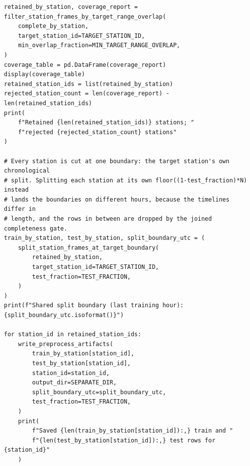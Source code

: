 \begin{verbatim}
retained_by_station, coverage_report = filter_station_frames_by_target_range_overlap(
    complete_by_station,
    target_station_id=TARGET_STATION_ID,
    min_overlap_fraction=MIN_TARGET_RANGE_OVERLAP,
)
coverage_table = pd.DataFrame(coverage_report)
display(coverage_table)
retained_station_ids = list(retained_by_station)
rejected_station_count = len(coverage_report) - len(retained_station_ids)
print(
    f"Retained {len(retained_station_ids)} stations; "
    f"rejected {rejected_station_count} stations"
)

# Every station is cut at one boundary: the target station's own chronological
# split. Splitting each station at its own floor((1-test_fraction)*N) instead
# lands the boundaries on different hours, because the timelines differ in
# length, and the rows in between are dropped by the joined completeness gate.
train_by_station, test_by_station, split_boundary_utc = (
    split_station_frames_at_target_boundary(
        retained_by_station,
        target_station_id=TARGET_STATION_ID,
        test_fraction=TEST_FRACTION,
    )
)
print(f"Shared split boundary (last training hour): {split_boundary_utc.isoformat()}")

for station_id in retained_station_ids:
    write_preprocess_artifacts(
        train_by_station[station_id],
        test_by_station[station_id],
        station_id=station_id,
        output_dir=SEPARATE_DIR,
        split_boundary_utc=split_boundary_utc,
        test_fraction=TEST_FRACTION,
    )
    print(
        f"Saved {len(train_by_station[station_id]):,} train and "
        f"{len(test_by_station[station_id]):,} test rows for {station_id}"
    )
\end{verbatim}

